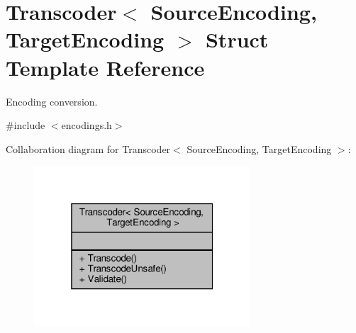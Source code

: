\hypertarget{structTranscoder}{}\section{Transcoder$<$ Source\+Encoding, Target\+Encoding $>$ Struct Template Reference}
\label{structTranscoder}


Encoding conversion.  




{\ttfamily \#include $<$encodings.\+h$>$}



Collaboration diagram for Transcoder$<$ Source\+Encoding, Target\+Encoding $>$\+:
\nopagebreak
\begin{figure}[H]
\begin{center}
\leavevmode
\includegraphics[width=229pt]{structTranscoder__coll__graph}
\end{center}
\end{figure}

